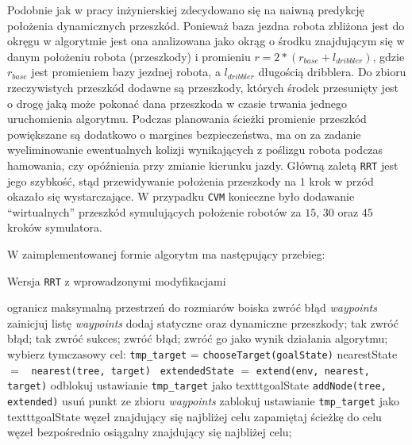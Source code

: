 Podobnie jak w pracy inżynierskiej \cite{inzynierka} zdecydowano się na naiwną predykcję położenia dynamicznych przeszkód. Ponieważ baza jezdna robota zbliżona jest do okręgu
w algorytmie jest ona analizowana jako okrąg o środku znajdującym się w danym położeniu robota (przeszkody) i promieniu $r=2*(r_{base} + l_{dribbler})$, gdzie $r_{base}$ jest
promieniem bazy jezdnej robota, a $l_{dribbler}$ długością dribblera.
Do zbioru rzeczywistych przeszkód dodawne są przeszkody, których  środek przesunięty jest o drogę jaką może pokonać dana przeszkoda w czasie trwania jednego uruchomienia algorytmu.
Podczas planowania ścieżki promienie przeszkód powiększane są dodatkowo o margines bezpieczeństwa, ma on za zadanie wyeliminowanie ewentualnych kolizji wynikających z poślizgu robota
podczas hamowania, czy opóźnienia przy zmianie kierunku jazdy. Główną zaletą \texttt{RRT} jest jego szybkość, stąd przewidywanie położenia przeszkody na $1$ krok w przód okazało
się wystarczające. W przypadku \texttt{CVM} konieczne było dodawanie ``wirtualnych'' przeszkód symulujących położenie robotów za $15$, $30$ oraz $45$ kroków symulatora. 

W zaimplementowanej formie algorytm ma następujący przebieg:
  \begin{algorithm}[H]
	\caption{ Wersja \texttt{RRT} z wprowadzonymi modyfikacjami }
	\label{alg:myRRT}
	\begin{algorithmic}
	\STATE ogranicz maksymalną przestrzeń do rozmiarów boiska
	 \STATE zwróć błąd \textit{waypoints} \ENDIF
	 \STATE zainicjuj listę \textit{waypoints} \ENDIF
	\STATE dodaj statyczne oraz dynamiczne przeszkody;
	 \STATE tak zwróć błąd;\ENDIF
	 \STATE tak zwróć sukces;\ENDIF
	 \STATE zwróć błąd;\ENDIF
	 \STATE zwróć go jako wynik działania algorytmu;\ENDIF
	  \STATE wybierz tymczasowy cel: \texttt{tmp\_target} =  \texttt{chooseTarget(goalState)}
	  \STATE nearestState $=$ \texttt{ nearest(tree, target) }
	  \STATE \texttt{extendedState} $=$ \texttt{extend(env, nearest, target)}
	    \STATE odblokuj ustawianie \texttt{tmp\_target} jako texttt{goalState}
	    \STATE \texttt{addNode(tree, extended)}
	    \STATE usuń punkt ze zbioru \textit{waypoints}
	    \STATE zablokuj ustawianie \texttt{tmp\_target} jako texttt{goalState}
	  \ENDIF
	\ENDWHILE
	\RETURN węzeł znajdujący się najbliżej celu
	\ELSE
	  \STATE zapamiętaj ścieżkę do celu
	  \RETURN  węzeł bezpośrednio osiągalny znajdujący się najbliżej celu;
	\ENDIF 
	\end{algorithmic}
  \end{algorithm}

